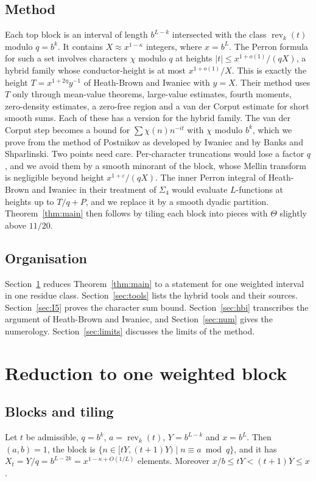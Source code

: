 \documentclass[11pt]{amsart}
\theoremstyle{definition}
\numberwithin{equation}{section}
\newcommand{\rev}{\operatorname{rev}}
\begin{document}
\subsection{Method}
Each top block is an interval of length $b^{L-k}$ intersected with the class $\rev_k(t)$ modulo $q=b^k$. It contains $X\approx x^{1-\kappa}$ integers, where $x=b^L$. The Perron formula for such a set involves characters $\chi$ modulo $q$ at heights $|t|\le x^{1+o(1)}/(qX)$, a hybrid family whose conductor-height is at most $x^{1+o(1)}/X$. This is exactly the height $T=x^{1+2\eta}y^{-1}$ of Heath-Brown and Iwaniec with $y=X$. Their method uses $T$ only through mean-value theorems, large-value estimates, fourth moments, zero-density estimates, a zero-free region and a van der Corput estimate for short smooth sums. Each of these has a version for the hybrid family. The van der Corput step becomes a bound for $\sum\chi(n)n^{-it}$ with $\chi$ modulo $b^k$, which we prove from the method of Postnikov as developed by Iwaniec and by Banks and Shparlinski. Two points need care. Per-character truncations would lose a factor $q$, and we avoid them by a smooth minorant of the block, whose Mellin transform is negligible beyond height $x^{1+\varepsilon}/(qX)$. The inner Perron integral of Heath-Brown and Iwaniec in their treatment of $\Sigma_4$ would evaluate $L$-functions at heights up to $T/q+P$, and we replace it by a smooth dyadic partition. Theorem~\ref{thm:main} then follows by tiling each block into pieces with $\Theta$ slightly above $11/20$.

\subsection{Organisation}
Section~\ref{sec:reduction} reduces Theorem~\ref{thm:main} to a statement for one weighted interval in one residue class. Section~\ref{sec:tools} lists the hybrid tools and their sources. Section~\ref{sec:I5} proves the character sum bound. Section~\ref{sec:hbi} transcribes the argument of Heath-Brown and Iwaniec, and Section~\ref{sec:num} gives the numerology. Section~\ref{sec:limits} discusses the limits of the method.

\section{Reduction to one weighted block}\label{sec:reduction}

\subsection{Blocks and tiling}
Let $t$ be admissible, $q=b^k$, $a=\rev_k(t)$, $Y=b^{L-k}$ and $x=b^L$. Then $(a,b)=1$, the block is $\{n\in[tY,(t+1)Y)\mid n\equiv a\bmod q\}$, and it has $X_t=Y/q=b^{L-2k}=x^{1-\kappa+O(1/L)}$ elements. Moreover $x/b\le tY<(t+1)Y\le x$.
\end{document}

